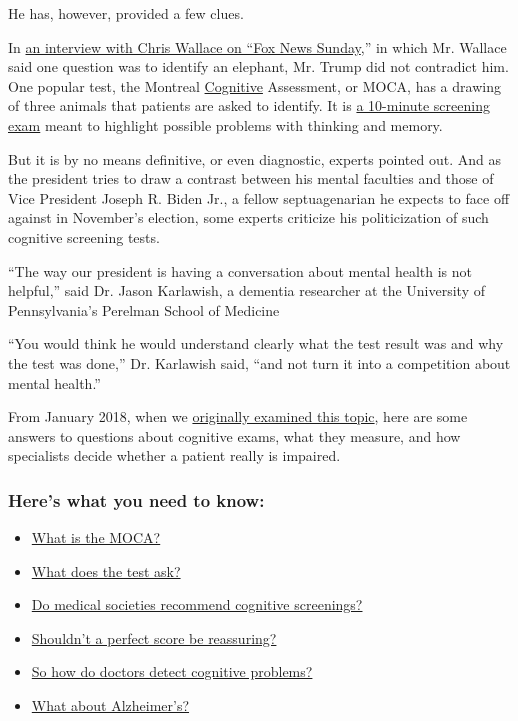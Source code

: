 He has, however, provided a few clues.

In
\href{https://www.nytimes.com/2020/07/19/us/politics/trump-fox-interview-coronavirus-race.html}{an
interview with Chris Wallace on ``Fox News Sunday},'' in which Mr.
Wallace said one question was to identify an elephant, Mr. Trump did not
contradict him. One popular test, the Montreal
\href{https://www.nytimes.com/2020/07/10/us/politics/trump-cognitive-test-health.html}{Cognitive}
Assessment, or MOCA, has a drawing of three animals that patients are
asked to identify. It is
\href{https://www.mocatest.org/wp-content/uploads/2017/01/MoCA-New-Test-8.1-2017-04.pdf}{a
10-minute screening exam} meant to highlight possible problems with
thinking and memory.

But it is by no means definitive, or even diagnostic, experts pointed
out. And as the president tries to draw a contrast between his mental
faculties and those of Vice President Joseph R. Biden Jr., a fellow
septuagenarian he expects to face off against in November's election,
some experts criticize his politicization of such cognitive screening
tests.

``The way our president is having a conversation about mental health is
not helpful,'' said Dr. Jason Karlawish, a dementia researcher at the
University of Pennsylvania's Perelman School of Medicine

``You would think he would understand clearly what the test result was
and why the test was done,'' Dr. Karlawish said, ``and not turn it into
a competition about mental health.''

From January 2018, when we
\href{https://www.nytimes.com/2018/01/19/health/trump-cognitive-screening-dementia.html}{originally
examined this topic}, here are some answers to questions about cognitive
exams, what they measure, and how specialists decide whether a patient
really is impaired.

\hypertarget{heres-what-you-need-to-know}{%
\subsubsection{Here's what you need to
know:}\label{heres-what-you-need-to-know}}

\begin{itemize}
\tightlist
\item
  \protect\hyperlink{link-65e034cc}{What is the MOCA?}
\item
  \protect\hyperlink{link-1a1aa9aa}{What does the test ask?}
\item
  \protect\hyperlink{link-1777dbe1}{Do medical societies recommend
  cognitive screenings?}
\item
  \protect\hyperlink{link-2fe34d74}{Shouldn't a perfect score be
  reassuring?}
\item
  \protect\hyperlink{link-31dbf01d}{So how do doctors detect cognitive
  problems?}
\item
  \protect\hyperlink{link-5943b1a8}{What about Alzheimer's?}
\end{itemize}

